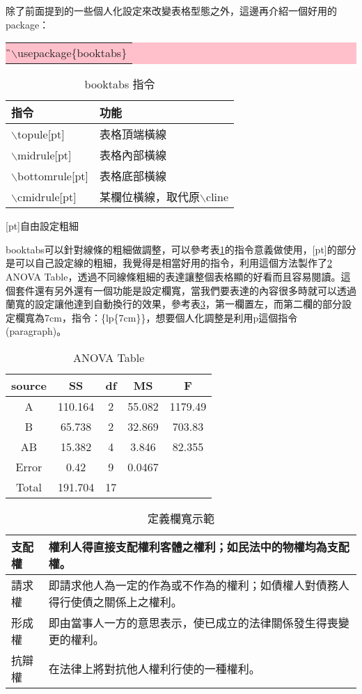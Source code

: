 除了前面提到的一些個人化設定來改變表格型態之外，這邊再介紹一個好用的package：
\begin{center}
	\colorbox{pink}{\begin{tabular}{p{}}
	{\G $\backslash$usepackage\{booktabs\}}
\end{tabular}}
\end{center}
\bigskip
\begin{table}[h]
	\centering
	\caption{booktabs 指令}\label{booktabs}
	\begin{tabular}{ll}	
	指令 & 功能 \\\toprule[1pt]
	$\backslash$topule[pt] & 表格頂端橫線\\
	$\backslash$midrule[pt] & 表格內部橫線\\
	$\backslash$bottomrule[pt] & 表格底部橫線\\
	$\backslash$cmidrule[pt] & 某欄位橫線，取代原$\backslash$cline\\\bottomrule[1pt]
	\end{tabular}\par\smallskip 
	\parbox{7cm}{[pt]自由設定粗細}
\end{table}
\newpage
booktabs可以針對線條的粗細做調整，可以參考表\ref{booktabs}的指令意義做使用，[pt]的部分是可以自己設定線的粗細，我覺得是相當好用的指令，利用這個方法製作了\ref{anova} ANOVA Table，透過不同線條粗細的表達讓整個表格顯的好看而且容易閱讀。這個套件還有另外還有一個功能是設定欄寬，當我們要表達的內容很多時就可以透過蘭寬的設定讓他達到自動換行的效果，參考表\ref{right}，第一欄置左，而第二欄的部分設定欄寬為7cm，指令：{\C \{lp\{7cm\}\}}，想要個人化調整是利用p這個指令(paragraph)。

\begin{table}[h]
	\centering
	\caption{ANOVA Table}\label{anova}
	\begin{tabular}{ccccc}
	\toprule[1pt]
	source & SS & df & MS & F \\\toprule[2pt]
	A	&	110.164	& 2	& 55.082	& 1179.49\\\hline
	B	&	65.738	&	2 & 32.869	& 703.83 \\\hline
	AB	& 15.382	& 4 	& 3.846 & 82.355 \\\hline
	Error	& 0.42	& 9 & 0.0467	& \\\bottomrule[1.5pt]
	Total & 191.704 & 17 & & \\
	\end{tabular}
\end{table}
\begin{table}[h]
	\centering
	\extrarowheight=4pt 
	\caption{定義欄寬示範}\label{right}
	\begin{tabular}{lp{7cm}}
	\hline
	支配權 & 權利人得直接支配權利客體之權利；如民法中的物權均為支配權。\\\hline
	請求權 & 即請求他人為一定的作為或不作為的權利；如債權人對債務人得行使債之關係上之權利。\\\hline
	形成權 & 即由當事人一方的意思表示，使已成立的法律關係發生得喪變更的權利。\\\hline
	抗辯權 & 在法律上將對抗他人權利行使的一種權利。\\\hline
	\end{tabular}
\end{table}

